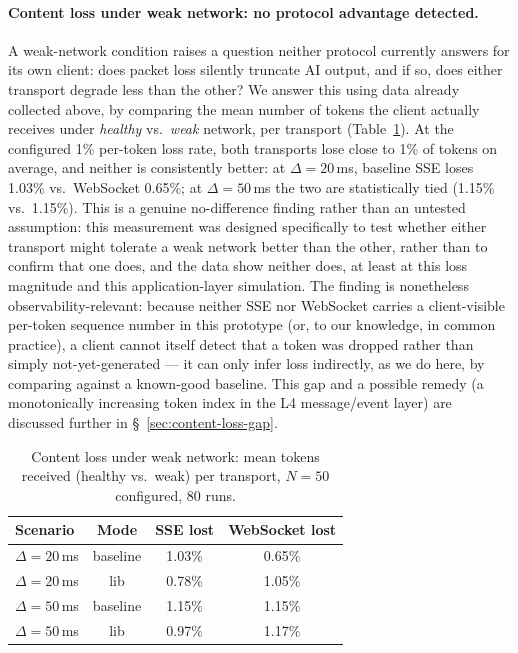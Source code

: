 \documentclass[11pt]{article}
\begin{document}
\paragraph{Content loss under weak network: no protocol advantage detected.} A weak-network condition raises a question neither protocol currently answers for its own client: does packet loss silently truncate AI output, and if so, does either transport degrade less than the other? We answer this using data already collected above, by comparing the mean number of tokens the client actually receives under \emph{healthy} vs.\ \emph{weak} network, per transport (Table~\ref{tab:content-loss}). At the configured 1\% per-token loss rate, both transports lose close to 1\% of tokens on average, and neither is consistently better: at $\Delta=20$\,ms, baseline SSE loses 1.03\% vs.\ WebSocket 0.65\%; at $\Delta=50$\,ms the two are statistically tied (1.15\% vs.\ 1.15\%). This is a genuine no-difference finding rather than an untested assumption: this measurement was designed specifically to test whether either transport might tolerate a weak network better than the other, rather than to confirm that one does, and the data show neither does, at least at this loss magnitude and this application-layer simulation. The finding is nonetheless observability-relevant: because neither SSE nor WebSocket carries a client-visible per-token sequence number in this prototype (or, to our knowledge, in common practice), a client cannot itself detect that a token was dropped rather than simply not-yet-generated --- it can only infer loss indirectly, as we do here, by comparing against a known-good baseline. This gap and a possible remedy (a monotonically increasing token index in the L4 message/event layer) are discussed further in \S~\ref{sec:content-loss-gap}.

\begin{table}[H]
\centering\small
\caption{Content loss under weak network: mean tokens received (healthy vs.\ weak) per transport, $N=50$ configured, 80 runs.}
\label{tab:content-loss}
\begin{tabular}{@{}lccc@{}}
\toprule
Scenario & Mode & SSE lost & WebSocket lost \\
\midrule
$\Delta=20$\,ms & baseline & 1.03\% & 0.65\% \\
$\Delta=20$\,ms & lib & 0.78\% & 1.05\% \\
$\Delta=50$\,ms & baseline & 1.15\% & 1.15\% \\
$\Delta=50$\,ms & lib & 0.97\% & 1.17\% \\
\bottomrule
\end{tabular}
\end{table}
\end{document}
